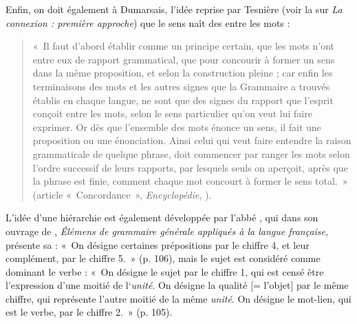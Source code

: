 {    Enfin, on doit également à Dumarsais, l’idée reprise par Tesnière (voir la  sur \textit{La connexion : première approche}) que le sens naît des  entre les mots : 
    \begin{quote}«~Il faut d’abord établir comme un principe certain, que les mots n’ont entre eux de rapport grammatical, que pour concourir à former un sens dans la même proposition, et selon la construction pleine ; car enfin les terminaisons des mots et les autres signes que la Grammaire a trouvés établis en chaque langue, ne sont que des signes du rapport que l’esprit conçoit entre les mots, selon le sens particulier qu’on veut lui faire exprimer. Or dès que l’ensemble des mots énonce un sens, il fait une proposition ou une énonciation. Ainsi celui qui veut faire entendre la raison grammaticale de quelque phrase, doit commencer par ranger les mots selon l’ordre successif de leurs rapports, par lesquels seuls on aperçoit, après que la phrase est finie, comment chaque mot concourt à former le sens total.~» (article «~Concordance~», \textit{Encyclopédie}, \citeyear{Dumarsais1753}). \end{quote}

    L’idée d’une hiérarchie est également développée par l’abbé  , qui dans son ouvrage de \citeyear{sicard1801elemens}, \textit{Élémens de grammaire générale appliqués à la langue française}, présente sa : «~On désigne certaines prépositions par le chiffre 4, et leur complément, par le chiffre 5.~» (p. 106), mais le sujet est considéré comme dominant le verbe : «~On désigne le sujet par le chiffre 1, qui est censé être l’expression d’une moitié de l‘\textit{unité}. On désigne la qualité [= l’objet] par le même chiffre, qui représente l’autre moitié de la même \textit{unité}. On désigne le mot-lien, qui est le verbe, par le chiffre 2.~» (p. 105).

}

